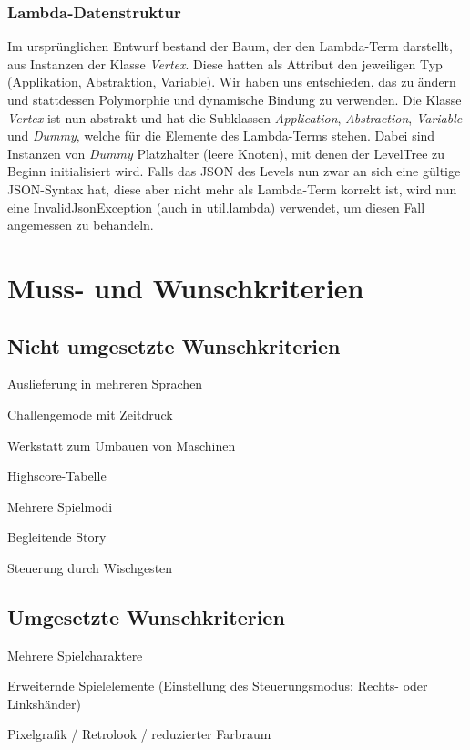 \documentclass[parskip=full]{scrreprt}
\begin{document}
\subsection{Lambda-Datenstruktur}

Im ursprünglichen Entwurf bestand der Baum, der den Lambda-Term darstellt, aus Instanzen der Klasse \textit{Vertex}. Diese hatten als Attribut den jeweiligen Typ (Applikation, Abstraktion, Variable). Wir haben uns entschieden, das zu ändern und stattdessen Polymorphie und dynamische Bindung zu verwenden. Die Klasse \textit{Vertex} ist nun abstrakt und hat die Subklassen \textit{Application}, \textit{Abstraction}, \textit{Variable} und \textit{Dummy}, welche für die Elemente des Lambda-Terms stehen. Dabei sind Instanzen von \textit{Dummy} Platzhalter (leere Knoten), mit denen der LevelTree zu Beginn initialisiert wird.
Falls das JSON des Levels nun zwar an sich eine gültige JSON-Syntax hat, diese aber nicht mehr als Lambda-Term korrekt ist, wird nun eine InvalidJsonException (auch in util.lambda) verwendet, um diesen Fall angemessen zu behandeln.

\chapter{Muss- und Wunschkriterien}

\section{Nicht umgesetzte Wunschkriterien}

\begin{description}
	\item Auslieferung in mehreren Sprachen
	\item Challengemode mit Zeitdruck
	\item Werkstatt zum Umbauen von Maschinen
	\item Highscore-Tabelle
	\item Mehrere Spielmodi
	\item Begleitende Story
	\item Steuerung durch Wischgesten
\end{description}

\section{Umgesetzte Wunschkriterien}

\begin{description}
	\item Mehrere Spielcharaktere
	\item Erweiternde Spielelemente (Einstellung des Steuerungsmodus: Rechts- oder Linkshänder)
	\item Pixelgrafik / Retrolook / reduzierter Farbraum
\end{description}
\end{document}

